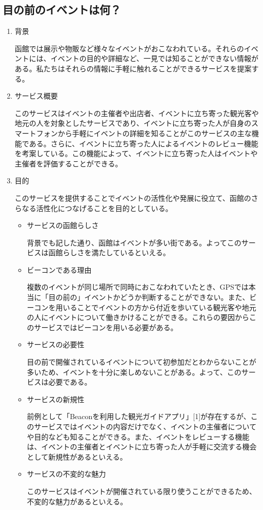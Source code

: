 \subsection{目の前のイベントは何？}
\begin{enumerate}
    \item 背景
    \par 函館では展示や物販など様々なイベントがおこなわれている。それらのイベントには、イベントの目的や詳細など、一見では知ることができない情報がある。私たちはそれらの情報に手軽に触れることができるサービスを提案する。
    \item サービス概要
    \par このサービスはイベントの主催者や出店者、イベントに立ち寄った観光客や地元の人を対象としたサービスであり、イベントに立ち寄った人が自身のスマートフォンから手軽にイベントの詳細を知ることがこのサービスの主な機能である。さらに、イベントに立ち寄った人によるイベントのレビュー機能を考案している。この機能によって、イベントに立ち寄った人はイベントや主催者を評価することができる。
    \item 目的
    \par このサービスを提供することでイベントの活性化や発展に役立て、函館のさらなる活性化につなげることを目的としている。    
\begin{itemize}
        \item サービスの函館らしさ
        \par 背景でも記した通り、函館はイベントが多い街である。よってこのサービスは函館らしさを満たしているといえる。
        \item ビーコンである理由
        \par 複数のイベントが同じ場所で同時におこなわれていたとき、GPSでは本当に「目の前の」イベントかどうか判断することができない。また、ビーコンを用いることでイベントの方から付近を歩いている観光客や地元の人にイベントについて働きかけることができる。これらの要因からこのサービスではビーコンを用いる必要がある。
        \item サービスの必要性
        \par 目の前で開催されているイベントについて初参加だとわからないことが多いため、イベントを十分に楽しめないことがある。よって、このサービスは必要である。
        \item サービスの新規性
        \par 前例として「Beaconを利用した観光ガイドアプリ」[1]が存在するが、このサービスではイベントの内容だけでなく、イベントの主催者についてや目的なども知ることができる。また、イベントをレビューする機能は、イベントの主催者とイベントに立ち寄った人が手軽に交流する機会として新規性があるといえる。
        \item サービスの不変的な魅力
        \par このサービスはイベントが開催されている限り使うことができるため、不変的な魅力があるといえる。
    \end{itemize}
\end{enumerate}


